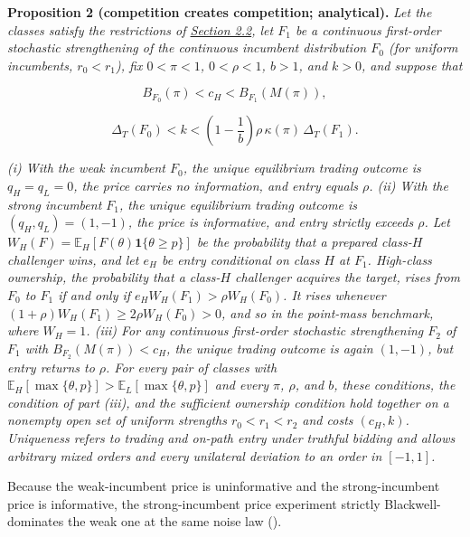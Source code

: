 
\protect{}\label{result-proposition-2}{\textbf{Proposition
2 (competition creates competition; analytical).}} \emph{Let the classes
satisfy the restrictions of
\hyperref[sec-values-preparation-and-the-sale]{Section 2.2}, let \(F_1\)
be a continuous first-order stochastic strengthening of the continuous
incumbent distribution \(F_0\) (for uniform incumbents, \(r_0<r_1\)),
fix \(0<\pi<1\), \(0<\rho<1\), \(b>1\), and \(k>0\), and suppose that}

\[
B_{F_0}(\pi)<c_H<B_{F_1}(M(\pi)),
\tag{A2}\label{eq:paper-a2}
\]

\[
\Delta_T(F_0)<k<\left(1-\frac1b\right)\rho\,\kappa(\pi)\,\Delta_T(F_1).
\tag{A3}\label{eq:paper-a3}
\]

\emph{(i) With the weak incumbent \(F_0\), the unique equilibrium
trading outcome is \(q_H=q_L=0\), the price carries no information, and
entry equals \(\rho\). (ii) With the strong incumbent \(F_1\), the
unique equilibrium trading outcome is \((q_H,q_L)=(1,-1)\), the price is
informative, and entry strictly exceeds \(\rho\). Let
\(W_H(F)=\mathbb E_H[F(\theta)\mathbf1\{\theta\ge p\}]\) be the
probability that a prepared class-\(H\) challenger wins, and let
\(e_H\) be entry conditional on class \(H\) at \(F_1\). High-class
ownership, the probability that a class-\(H\) challenger acquires the
target, rises from \(F_0\) to \(F_1\) if and only if
\(e_HW_H(F_1)>\rho W_H(F_0)\). It rises whenever
\((1+\rho)W_H(F_1)\ge2\rho W_H(F_0)>0\), and so in the point-mass
benchmark, where \(W_H=1\). (iii) For any continuous first-order
stochastic strengthening \(F_2\) of \(F_1\) with
\(B_{F_2}(M(\pi))<c_H\), the unique trading outcome is again
\((1,-1)\), but entry returns to \(\rho\). For every pair of classes
with \(\mathbb E_H[\max\{\theta,p\}]>\mathbb E_L[\max\{\theta,p\}]\)
and every \(\pi\), \(\rho\), and \(b\), these conditions, the condition
of part (iii), and the sufficient ownership condition hold together on a
nonempty open set of uniform strengths \(r_0<r_1<r_2\) and costs
\((c_H,k)\). Uniqueness refers to trading and on-path entry under
truthful bidding and allows arbitrary mixed orders and every unilateral
deviation to an order in \([-1,1]\).}

Because the weak-incumbent price is uninformative and the strong-incumbent price is informative, the strong-incumbent price experiment strictly Blackwell-dominates the weak one at the same noise law ().

